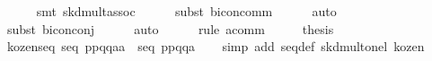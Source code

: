 \begin{isabellebody}
\ \ \ \ \isamarkupfalse%
\ {}smt\ skd{}mult{}assoc{}\isanewline
\ \ \ \ \isamarkupfalse%
\ {}subst\ bicon{}comm{}\isanewline
\ \ \ \ \isamarkupfalse%
\ auto\isanewline
\ \ \ \ \isamarkupfalse%
\ {}subst\ bicon{}conj{}{}\isanewline
\ \ \ \ \isamarkupfalse%
\ auto\isanewline
\ \ \ \ \isamarkupfalse%
\ {}rule\ a{}comm{}\isanewline
\ \ \isamarkupfalse%
\ \isamarkupfalse%
\ {}thesis\ \isamarkupfalse%
\isanewline
{}\isamarkupfalse%
%
\endisatagproof
{\isafoldproof}%
%
\isadelimproof
\isanewline
%
\endisadelimproof
\isanewline
{}\isamarkupfalse%
\ kozen{}{}seq{}\ {}seq\ {}p{}{}{}p{}{}{}q{}{}{}{}q{}{}{}{}a{}{}a{}{}\ {}\ seq\ {}p{}{}{}p{}{}{}q{}{}{}{}q{}{}{}{}a{}{}{}\isanewline
%
\isadelimproof
\ \ %
\endisadelimproof
%
\isatagproof
{}\isamarkupfalse%
\ {}simp\ add{}\ seq{}def\ skd{}mult{}onel\ kozen{}{}%

\end{isabellebody}
